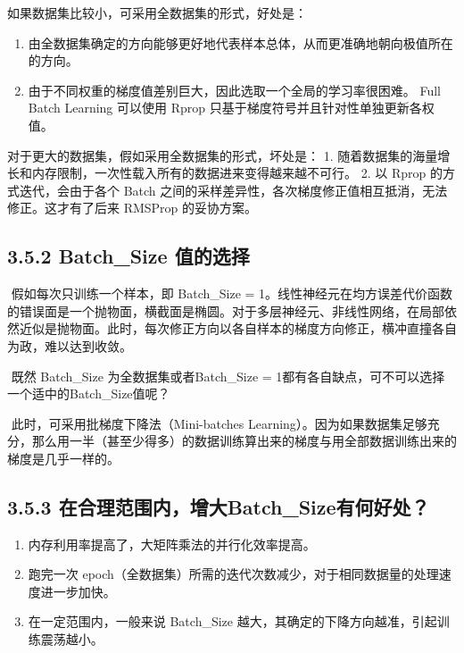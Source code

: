 如果数据集比较小，可采用全数据集的形式，好处是：

\begin{enumerate}
\def\labelenumi{\arabic{enumi}.}
 
\item
  由全数据集确定的方向能够更好地代表样本总体，从而更准确地朝向极值所在的方向。
\item
  由于不同权重的梯度值差别巨大，因此选取一个全局的学习率很困难。 Full
  Batch Learning 可以使用 Rprop 只基于梯度符号并且针对性单独更新各权值。
\end{enumerate}

对于更大的数据集，假如采用全数据集的形式，坏处是： 1.
随着数据集的海量增长和内存限制，一次性载入所有的数据进来变得越来越不可行。
2. 以 Rprop 的方式迭代，会由于各个 Batch
之间的采样差异性，各次梯度修正值相互抵消，无法修正。这才有了后来 RMSProp
的妥协方案。

\subsection{3.5.2 Batch\_Size
值的选择}\label{batch_size-ux503cux7684ux9009ux62e9}

​ 假如每次只训练一个样本，即 Batch\_Size =
1。线性神经元在均方误差代价函数的错误面是一个抛物面，横截面是椭圆。对于多层神经元、非线性网络，在局部依然近似是抛物面。此时，每次修正方向以各自样本的梯度方向修正，横冲直撞各自为政，难以达到收敛。

​ 既然 Batch\_Size 为全数据集或者Batch\_Size =
1都有各自缺点，可不可以选择一个适中的Batch\_Size值呢？

​ 此时，可采用批梯度下降法（Mini-batches
Learning）。因为如果数据集足够充分，那么用一半（甚至少得多）的数据训练算出来的梯度与用全部数据训练出来的梯度是几乎一样的。

\subsection{3.5.3
在合理范围内，增大Batch\_Size有何好处？}\label{ux5728ux5408ux7406ux8303ux56f4ux5185ux589eux5927batch_sizeux6709ux4f55ux597dux5904}

\begin{enumerate}
\def\labelenumi{\arabic{enumi}.}
 
\item
  内存利用率提高了，大矩阵乘法的并行化效率提高。
\item
  跑完一次
  epoch（全数据集）所需的迭代次数减少，对于相同数据量的处理速度进一步加快。
\item
  在一定范围内，一般来说 Batch\_Size
  越大，其确定的下降方向越准，引起训练震荡越小。
\end{enumerate}

